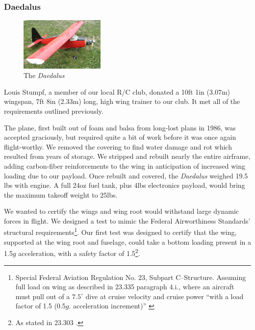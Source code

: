 \documentclass[pdftex,10pt,letter]{article}
\newcommand{\degrees}[1]
{
\begin{math}
#1^{\circ} 
\end{math}
}
\begin{document}
\subsubsection{Daedalus}
\begin{figure}
	\includegraphics[width=0.37\textwidth]{../images/daedalus_isometric.jpg}
	\caption{The \emph{Daedalus}}
	\label{fig:daedalus}
\end{figure}
Louis Stumpf, a member of our local R/C club, donated a 10ft 1in (3.07m) wingspan, 7ft 8in (2.33m) long, high wing trainer to our club. It met all of the requirements outlined previously.

The plane, first built out of foam and balsa from long-lost plans in 1986, was accepted graciously, but required quite a bit of work before it was once again flight-worthy. We removed the covering to find water damage and rot which resulted from years of storage. We stripped and rebuilt nearly the entire airframe, adding carbon-fiber reinforcements to the wing in anticipation of increased wing loading due to our payload. Once rebuilt and covered,  the \emph{Daedalus} weighed 19.5 lbs with engine. A full 24oz fuel tank, plus 4lbs electronics payload, would bring the maximum takeoff weight to 25lbs.

We wanted to certify the wings and wing root would withstand large dynamic forces in flight. 
We designed a test to mimic the 
Federal Airworthiness Standards' structural requirements\footnote{Special Federal Aviation Regulation No. 23, Subpart C--Structure. Assuming full load on wing as described in 23.335 paragraph 4.i., where an aircraft must pull out of a \degrees{7.5} dive at cruise velocity and cruise power ``with a load factor of 1.5 (0.5$g$. acceleration increment)'' \cite{far23}}. Our first test was designed to certify that the wing, supported at the wing root and fuselage, could take a bottom loading present in a 1.5$g$ acceleration, with a safety factor of 1.5\footnote{As stated in 23.303 \cite{far23}.}.
\end{document}

